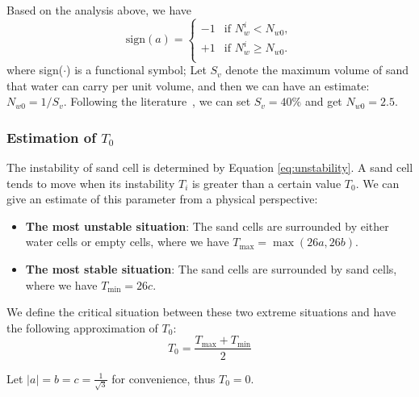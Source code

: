 \documentclass{mcmthesis}		    %
\begin{document}
	Based on the analysis above, we have
	\begin{equation}\label{a sign}
	   \text{sign}(a) =
\begin{cases}
-1 & \text{if } N_w^{i} < N_{w0},\\
+1 & \text{if } N_w^{i} \geq N_{w0}.\\
\end{cases} 
	\end{equation}
    \noindent
    where sign($\cdot$) is a functional symbol; Let $S_v$ denote the maximum volume of sand that water can carry per unit volume, and then we can have an estimate: $N_{w0}=1/S_v$. Following the literature~\cite{hornbaker1997keeps,zhang2020study}, we can set $S_v = 40\%$ and get $N_{w0}=2.5$.


	\subsubsection{Estimation of $T_0$}\label{T0anyla}
	The instability of sand cell is determined by Equation \ref{eq:unstability}. A sand cell tends to move when its instability $T_i$ is greater than a certain value $T_0$. We can give an estimate of this parameter from a physical perspective:
	
	\begin{itemize}
	    \item \textbf{The most unstable situation}: The sand cells are surrounded by either water cells or empty cells, where we have $T_{\text{max}}=\max(26a,26b)$.
	    \item \textbf{The most stable situation}: The sand cells are surrounded by sand cells, where we have $T_{\text{min}}=26c$.
	\end{itemize}
	
	We define the critical situation between these two extreme situations and have the following approximation of $T_0$:
	\begin{equation}\label{eq:T0}
	    T_0 = \frac{T_{\text{max}} + T_{\text{min}}}{2}
	\end{equation}
	
	Let $|a|=b=c=\frac{1}{\sqrt{3}}$ for convenience, thus $T_0=0$.
\end{document}
